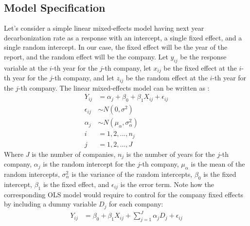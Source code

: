 \subsection{Model Specification}
Let's consider a simple linear mixed-effects model having next year decarbonization rate as a response with an intercept, a single fixed effect, and a single random intercept. In our case, the fixed effect will be the year of the report, and the random effect will be the company. Let $y_{ij}$ be the response variable at the $i$-th year for the $j$-th company, let $x_{ij}$ be the fixed effect at the $i$-th year for the $j$-th company, and let $z_{ij}$ be the random effect at the $i$-th year for the $j$-th company. The linear mixed-effects model can be written as \cite{duke_sta216_lecture}:
\begin{align}
    Y_{ij} &= \alpha_j + \beta_0 + \beta_1 X_{ij} + \epsilon_{ij} \\
    \epsilon_{ij} &\sim N(0, \sigma^2) \\
    \alpha_j &\sim N(\mu_{\alpha}, \sigma^2_{\alpha}) \\
    i &= 1, 2, ..., n_j \\
    j &= 1, 2, ..., J
\end{align}
Where $J$ is the number of companies, $n_j$ is the number of years for the $j$-th company, $\alpha_j$ is the random intercept for the $j$-th company, $\mu_{\alpha}$ is the mean of the random intercepts, $\sigma^2_{\alpha}$ is the variance of the random intercepts, $\beta_0$ is the fixed intercept, $\beta_1$ is the fixed effect, and $\epsilon_{ij}$ is the error term. Note how the corresponding OLS model would require to control for the company fixed effects by including a dummy variable $D_j$ for each company:
\begin{align}
    Y_{ij} &= \beta_0 + \beta_1 X_{ij} + \sum_{j=1}^{J} \alpha_j D_j + \epsilon_{ij}
\end{align}
